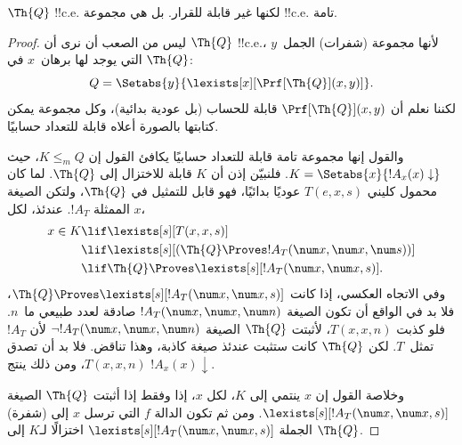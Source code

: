\documentclass[../../../include/open-logic-section]{subfiles}
\begin{document}



\begin{thm}
$\Th{Q}$ !!{c.e.} لكنها غير قابلة للقرار. بل هي مجموعة !!{c.e.}
تامة.
\end{thm}

\begin{proof}
ليس من الصعب أن نرى أن $\Th{Q}$ !!{c.e.}، لأنها مجموعة
(شفرات) الجمل~$y$ التي يوجد لها برهان~$x$ في $\Th{Q}$:
\[
Q = \Setabs{y}{\lexists[x][\Prf[\Th{Q}](x,y)]}.
\]
لكننا نعلم أن $\Prf[\Th{Q}](x,y)$ قابلة للحساب (بل عودية بدائية)،
وكل مجموعة يمكن كتابتها بالصورة أعلاه قابلة للتعداد حسابيًا.

والقول إنها مجموعة تامة قابلة للتعداد حسابيًا يكافئ القول إن
$K\leq_m Q$، حيث $K=\Setabs{x}{!A_x(x)\downarrow}$. فلنبيّن إذن أن
$K$ قابلة للاختزال إلى $\Th{Q}$. لما كان محمول كليني $T(e,x,s)$
عوديًا بدائيًا، فهو قابل للتمثيل في $\Th{Q}$، ولتكن الصيغة الممثلة
$!A_T$. عندئذ، لكل $x$،
\begin{align*}
x \in K & \lif \lexists[s][T(x,x,s)] \\
& \lif \lexists[s][(\Th{Q} \Proves !A_T(\num x,\num x, \num s))]
  \\
& \lif \Th{Q} \Proves \lexists[s][!A_T(\num x, \num x, s)].
\end{align*}
وفي الاتجاه العكسي، إذا كانت
$\Th{Q}\Proves\lexists[s][!A_T(\num x,\num x,s)]$، فلا بد في
الواقع أن تكون الصيغة $!A_T(\num x,\num x,\num n)$ صادقة لعدد
طبيعي ما~$n$. فلو كذبت $T(x,x,n)$، لأثبتت $\Th{Q}$ الصيغة
$\lnot !A_T(\num x,\num x,\num n)$ لأن $!A_T$ تمثل~$T$. لكن
$\Th{Q}$ كانت ستثبت عندئذ صيغة كاذبة، وهذا تناقض. فلا بد أن تصدق
$T(x,x,n)$، ومن ذلك ينتج $!A_x(x)\downarrow$.

وخلاصة القول إن $x$ ينتمي إلى $K$، لكل $x$، إذا وفقط إذا أثبتت
$\Th{Q}$ الصيغة $\lexists[s][!A_T(\num x,\num x,s)]$. ومن ثم تكون
الدالة $f$ التي ترسل $x$ إلى (شفرة) الجملة
$\lexists[s][!A_T(\num x,\num x,s)]$ اختزالًا لـ$K$ إلى
$\Th{Q}$.
\end{proof}
\end{document}

